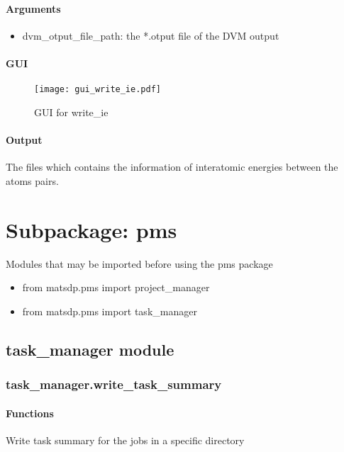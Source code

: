 \documentclass[12pt]{book}
\begin{document}
\subsubsection{Arguments}

\begin{itemize}
\item dvm\_otput\_file\_path: the *.otput file of the DVM output
\end{itemize}

\subsubsection{GUI}

\begin{figure}[htbp]
\centering
\texttt{[image: gui\_write\_ie.pdf]}
\caption{GUI for write\_ie}
\label{fig:GUI_write_ie}
\end{figure}

\subsubsection{Output}

The files which contains the information of interatomic energies between the atoms pairs.

\chapter{Subpackage: pms}

Modules that may be imported before using the pms package
\begin{itemize}
\item from matsdp.pms import project\_manager
\item from matsdp.pms import task\_manager
\end{itemize}

\section{task\_manager module}

\subsection{task\_manager.write\_task\_summary}
\subsubsection{Functions}
Write task summary for the jobs in a specific directory
\end{document}

